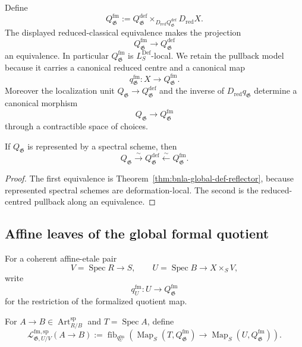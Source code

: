 \begin{definition}
\label{def:bnla-reduced-centred-formal-quotient}
Define
\[
\boxed{
    Q^{\mathrm{fm}}_{\mathfrak G}
    :=
    Q^{\mathrm{def}}_{\mathfrak G}
    \times_{D_{\mathrm{red}}Q^{\mathrm{def}}_{\mathfrak G}}
    D_{\mathrm{red}}X.}
\]
The displayed reduced-classical equivalence makes the projection
\[
    Q^{\mathrm{fm}}_{\mathfrak G}
    \longrightarrow
    Q^{\mathrm{def}}_{\mathfrak G}
\]
an equivalence.  In particular $Q^{\mathrm{fm}}_{\mathfrak G}$ is
$L^{\mathrm{Def}}_S$-local.  We retain the pullback model because it carries a canonical
reduced centre and a canonical map
\[
\boxed{
    q^{\mathrm{fm}}_{\mathfrak G}:
    X\longrightarrow Q^{\mathrm{fm}}_{\mathfrak G}.}
\]
Moreover the localization unit
$Q_{\mathfrak G}\to Q^{\mathrm{def}}_{\mathfrak G}$ and the inverse of
$D_{\mathrm{red}}q_{\mathfrak G}$ determine a canonical morphism
\[
    Q_{\mathfrak G}\longrightarrow Q^{\mathrm{fm}}_{\mathfrak G}
\]
through a contractible space of choices.
\end{definition}

\begin{proposition}
\label{prop:bnla-represented-quotient-artdef-local}
If $Q_{\mathfrak G}$ is represented by a spectral scheme, then
\[
\boxed{
    Q_{\mathfrak G}
    \xrightarrow{\sim}
    Q^{\mathrm{def}}_{\mathfrak G}
    \xleftarrow{\sim}
    Q^{\mathrm{fm}}_{\mathfrak G}.}
\]
\end{proposition}

\begin{proof}
The first equivalence is
Theorem~\ref{thm:bnla-global-def-reflector}, because represented spectral
schemes are deformation-local.  The second is the reduced-centred pullback
along an equivalence.
\end{proof}

\subsection{Affine leaves of the global formal quotient}

For a coherent affine-etale pair
\[
    V=\operatorname{Spec}R\longrightarrow S,
    \qquad
    U=\operatorname{Spec}B\longrightarrow X\times_SV,
\]
write
\[
    q^{\mathrm{fm}}_U:
    U\longrightarrow Q^{\mathrm{fm}}_{\mathfrak G}
\]
for the restriction of the formalized quotient map.

\begin{definition}
\label{def:bnla-affine-global-formal-leaf}
For $A\to B\in\operatorname{Art}^{\mathrm{sp}}_{R/B}$ and
$T=\operatorname{Spec}A$, define
\[
\boxed{
    \mathcal L^{\mathrm{fm,sp}}_{\mathfrak G,U/V}(A\to B)
    :=
    \operatorname{fib}_{q^{\mathrm{fm}}_U}
    \left(
        \operatorname{Map}_S(T,Q^{\mathrm{fm}}_{\mathfrak G})
        \longrightarrow
        \operatorname{Map}_S(U,Q^{\mathrm{fm}}_{\mathfrak G})
    \right).}
\]
\end{definition}

